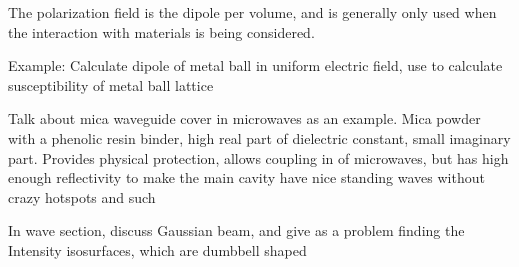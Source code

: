 \documentclass[12pt,a4paper,violet]{bbe}
\begin{document}
	The polarization field is the dipole per volume, and is generally only used when the interaction with materials is being considered.
	
	Example: Calculate dipole of metal ball in uniform electric field, use to calculate susceptibility of metal ball lattice
	


	Talk about mica waveguide cover in microwaves as an example. Mica powder with a phenolic resin binder, high real part of dielectric constant, small imaginary part.
	Provides physical protection, allows coupling in of microwaves, but has high enough reflectivity to make the main cavity have nice standing waves without crazy hotspots and such
	

	In wave section, discuss Gaussian beam, and give as a problem finding the Intensity isosurfaces, which are dumbbell shaped

	\blinddocument
	
\end{document}
